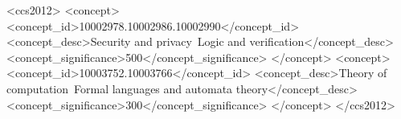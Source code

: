 %

 \begin{CCSXML}
<ccs2012>
<concept>
<concept_id>10002978.10002986.10002990</concept_id>
<concept_desc>Security and privacy~Logic and verification</concept_desc>
<concept_significance>500</concept_significance>
</concept>
<concept>
<concept_id>10003752.10003766</concept_id>
<concept_desc>Theory of computation~Formal languages and automata theory</concept_desc>
<concept_significance>300</concept_significance>
</concept>
</ccs2012>
\end{CCSXML}

%
%

